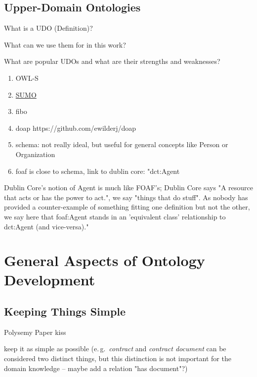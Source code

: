 \documentclass[a4paper, DIV=13, BCOR=0cm]{scrbook}
\newcommand{\eg}{e.\,g.\ }
\begin{document}
\subsection{Upper-Domain Ontologies}
\begin{compactenum}
	\item What is a UDO (Definition)?
	\item What can we use them for in this work?
	\item What are popular UDOs and what are their strengths and weaknesses?
	\begin{enumerate}
		\item OWL-S
		\item \href{https://en.wikipedia.org/wiki/Suggested_Upper_Merged_Ontology}{SUMO}
		\item \gls{fibo}
		\item \gls{doap} https://github.com/ewilderj/doap
		\item \gls{schema}: not really ideal, but useful for general concepts like Person or Organization
		\item \gls{foaf} is close to schema, link to dublin core: "dct:Agent
	\end{enumerate}
\end{compactenum}


Dublin Core's notion of Agent is much like FOAF's; Dublin Core says "A resource that acts or has the power to act.", we say "things that do stuff". As nobody has provided a counter-example of something fitting one definition but not the other, we say here that foaf:Agent stands in an 'equivalent class' relationship to dct:Agent (and vice-versa)." \cite[
External Vocabulary References]{Dan-Brickley2014FOAF-Vocabulary}



\section{General Aspects of Ontology Development}
\label{general-aspects}

\subsection{Keeping Things Simple }
\label{keeping-things-simple}
Polysemy Paper \cite{arapinis2015plea}
\gls{kiss}

keep it as simple as possible (\eg \textit{contract} and \textit{contract document} can be considered two distinct things, but this distinction is not important for the domain knowledge -- maybe add a relation "has document"?)
\end{document}
